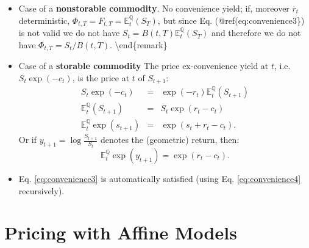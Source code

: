 \documentclass[
  12pt,
]{book}
\theoremstyle{definition}
\theoremstyle{definition}
\theoremstyle{definition}
\theoremstyle{definition}
\theoremstyle{remark}
\begin{document}
\begin{itemize}
\item
  Case of a \textbf{nonstorable commodity}. No convenience yield; if, moreover \(r_t\) deterministic, \(\Phi_{t,T} = F_{t,T} = \mathbb{E}^{\mathbb{Q}}_t (S_T)\), but since Eq. (@ref(eq:convenience3\}) is not valid we do not have \(S_t = B(t,T) \mathbb{E}^{\mathbb{Q}}_t (S_T)\) and therefore we do not have \(\Phi_{t,T} = S_t / B(t,T)\).
  \textbackslash end\{remark\}
\item
  Case of a \textbf{storable commodity}
  The price ex-convenience yield at \(t\), i.e.~\(S_t \exp (-c_t)\), is the price at \(t\) of \(S_{t+1}\):
  \begin{eqnarray}
  S_t \exp (-c_t) &=& \exp (-r_t) \mathbb{E}^{\mathbb{Q}}_t (S_{t+1}) \nonumber\\
  \mathbb{E}^{\mathbb{Q}}_t (S_{t+1}) & = & S_t \exp (r_t - c_t) \label{eq:convenience4} \\
  \mathbb{E}^{\mathbb{Q}}_t \exp (s_{t+1}) &=& \exp(s_t+r_t-c_t). \nonumber
  \end{eqnarray}
  Or if \(y_{t+1} = \log \frac{S_{t+1}}{S_t}\) denotes the (geometric) return, then:
  \[
  \mathbb{E}^{\mathbb{Q}}_t \exp (y_{t+1}) = \exp (r_t - c_t).
  \]
\item
  Eq. \eqref{eq:convenience3} is automatically satisfied (using Eq. \eqref{eq:convenience4} recursively).
\end{itemize}

\hypertarget{FCFPPricingRN}{%
\section{Pricing with Affine Models}\label{FCFPPricingRN}}
\end{document}
